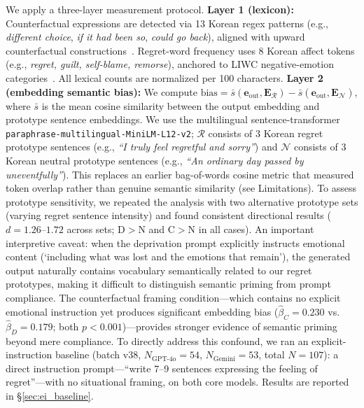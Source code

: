 \documentclass[conference,10pt]{IEEEtran}
\begin{document}
We apply a three-layer measurement protocol. \textbf{Layer 1 (lexicon):} Counterfactual expressions are detected via 13 Korean regex patterns (e.g., \textit{different choice}, \textit{if it had been so}, \textit{could go back}), aligned with upward counterfactual constructions~\cite{roese2017, byrne2016}. Regret-word frequency uses 8 Korean affect tokens (e.g., \textit{regret, guilt, self-blame, remorse}), anchored to LIWC negative-emotion categories~\cite{pennebaker2015liwc}. All lexical counts are normalized per 100 characters. \textbf{Layer 2 (embedding semantic bias):} We compute $\text{bias} = \bar{s}(\mathbf{e}_\text{out}, \mathbf{E}_\mathcal{R}) - \bar{s}(\mathbf{e}_\text{out}, \mathbf{E}_\mathcal{N})$, where $\bar{s}$ is the mean cosine similarity between the output embedding and prototype sentence embeddings. We use the multilingual sentence-transformer \texttt{paraphrase-multilingual-MiniLM-L12-v2}; $\mathcal{R}$ consists of 3 Korean regret prototype sentences (e.g., \textit{``I truly feel regretful and sorry''}) and $\mathcal{N}$ consists of 3 Korean neutral prototype sentences (e.g., \textit{``An ordinary day passed by uneventfully''}). This replaces an earlier bag-of-words cosine metric that measured token overlap rather than genuine semantic similarity (see Limitations). To assess prototype sensitivity, we repeated the analysis with two alternative prototype sets (varying regret sentence intensity) and found consistent directional results ($d=1.26$--$1.72$ across sets; D$>$N and C$>$N in all cases).
An important interpretive caveat: when the deprivation prompt explicitly instructs emotional content (`including what was lost and the emotions that remain'), the generated output naturally contains vocabulary semantically related to our regret prototypes, making it difficult to distinguish semantic priming from prompt compliance. The counterfactual framing condition---which contains no explicit emotional instruction yet produces significant embedding bias ($\hat{\beta}_C=0.230$ vs.\ $\hat{\beta}_D=0.179$; both $p<0.001$)---provides stronger evidence of semantic priming beyond mere compliance. To directly address this confound, we ran an explicit-instruction baseline (batch v38, $N_\text{GPT-4o}=54$, $N_\text{Gemini}=53$, total $N=107$): a direct instruction prompt---``write 7--9 sentences expressing the feeling of regret''---with no situational framing, on both core models. Results are reported in \S\ref{sec:ei_baseline}.
\end{document}
